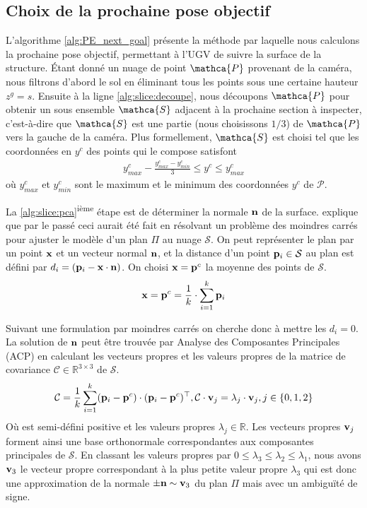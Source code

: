\subsection{Choix de la prochaine pose objectif}

L'algorithme \ref{alg:PE_next_goal} présente la méthode par laquelle nous calculons la prochaine pose objectif, permettant à l'UGV de suivre la surface de la structure. Étant donné un nuage de point $\mathca{P}$ provenant de la caméra, nous filtrons d'abord le sol en éliminant tous les points sous une certaine hauteur $z^g = s$. Ensuite à la ligne \ref{alg:slice:decoupe}, nous découpons $\mathca{P}$ pour obtenir un sous ensemble $\mathca{S}$ adjacent à la prochaine section à inspecter, c'est-à-dire que $\mathca{S}$ est une partie (nous choisissons $1/3$) de $\mathca{P}$ vers la gauche de la caméra. Plus formellement, $\mathca{S}$ est choisi tel que les coordonnées en $y^c$ des points qui le compose satisfont
\begin{align}
  y^c_{max} - \frac{y^c_{max} - y^c_{min}}{3} \leq y^c \leq y^c_{max}
\end{align}
où $y^c_{max}$ et $y^c_{min}$ sont le maximum et le minimum des coordonnées $y^c$ de $\mathcal{P}$.

La \ref{alg:slice:pca}\textsuperscript{ième} étape est de déterminer la normale $\mathbf{n}$ de la surface. \citep{Rusu2009} explique que par le passé ceci aurait été fait en résolvant un problème des moindres carrés pour ajuster le modèle d'un plan $\Pi$ au nuage $\mathcal{S}$. On peut représenter le plan par un point $\mathbf{x}$ et un vecteur normal $\mathbf{n}$, et la distance d'un point $\mathbf{p}_i \in \mathcal{S}$ au plan est défini par $d_i = (\mathbf{p}_i - \mathbf{x} \cdot \mathbf{n})$. On choisi $\mathbf{x} = \mathbf{p}^c$ la moyenne des points de $\mathcal{S}$.
\begin{align}
  \mathbf{x} = \mathbf{p}^c = \frac{1}{k} \cdot \sum^{k}_{i=1} \mathbf{p}_i
\end{align}

Suivant une formulation par moindres carrés on cherche donc à mettre les $d_i = 0$. La solution de $\mathbf{n}$ peut être trouvée par Analyse des Composantes Principales (ACP) en calculant les vecteurs propres et les valeurs propres de la matrice de covariance $\mathcal{C} \in \mathbb{R}^{3\times 3}$ de $\mathcal{S}$.
\begin{align}
  \mathcal{C} = \frac{1}{k} \sum^{k}_{i=1} (\mathbf{p}_i - \mathbf{p}^c) \cdot (\mathbf{p}_i - \mathbf{p}^c)^\top, \mathcal{C} \cdot \mathbf{v}_j = \lambda_j \cdot \mathbf{v}_j, j \in \{0, 1, 2\}
\end{align}
Où  est semi-défini positive et les valeurs propres $\lambda_j \in \mathbb{R}$. Les vecteurs propres $\mathbf{v}_j$ forment ainsi une base orthonormale correspondantes aux composantes principales de $\mathcal{S}$. En classant les valeurs propres par $0 \leq \lambda_3 \leq \lambda_2 \leq \lambda_1$, nous avons $\mathbf{v}_3$ le vecteur propre correspondant à la plus petite valeur propre $\lambda_3$ qui est donc une approximation de la normale $\pm \mathbf{n} \sim \mathbf{v}_{3}$ du plan $\Pi$ mais avec un ambiguïté de signe.

